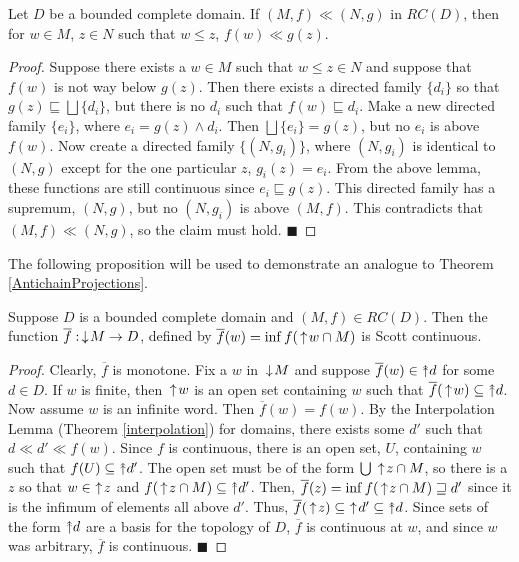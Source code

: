 \begin{proposition}\label{waybelow}
Let $D$ be a bounded complete domain.  If $(M,f) \ll (N,g)$ in $RC(D)$, then for $w\in M$, $z\in N$ such that $w\leq z$, $f(w) \ll g(z)$.
\end{proposition}
\begin{proof}
Suppose there exists a $w\in M$ such that $w\leq z\in N$ and suppose that $f(w)$ is not way below $g(z)$.  Then there exists a directed family $\{d_i\}$ so that $g(z)\sqsubseteq \bigsqcup \{d_i\}$, but there is no $d_i$ such that $f(w) \sqsubseteq d_i$.  Make a new directed family $\{e_i\}$, where $e_i = g(z) \wedge d_i$.  Then $\bigsqcup \{e_i\} = g(z)$, but no $e_i$ is above $f(w)$.  Now create a directed family $\{(N,g_i)\}$, where $(N,g_i)$ is identical to $(N,g)$ except for the one particular $z$, $g_i(z) = e_i$.  From the above lemma, these functions are still continuous since $e_i \sqsubseteq g(z)$.  This directed family has a supremum, $(N,g)$, but no $(N,g_i)$ is above $(M,f)$.  This contradicts that $(M,f) \ll (N,g)$, so the claim must hold. \hfill $\blacksquare$
\end{proof}
The following proposition will be used to demonstrate an analogue to Theorem \ref{AntichainProjections}.

\begin{proposition}
Suppose $D$ is a bounded complete domain and $(M,f)\in RC(D)$.  Then the function $\overline{f}:\,\downarrow\! M -> D$, defined by $\overline{f}(w) = \inf f(\,\uparrow\! w \cap M)$ is Scott continuous.
\end{proposition}
\begin{proof}
Clearly, $\overline{f}$ is monotone.  
Fix a $w$ in $\,\downarrow\! M$ and suppose $\overline{f}(w) \in \Ua d$ for some $d\in D$.  If $w$ is finite, then $\,\uparrow\! w$ is an open set containing $w$ such that $\overline{f}(\ua w) \subseteq \Ua d$.  Now assume $w$ is an infinite word.  Then $\overline{f}(w) = f(w)$.  By the Interpolation Lemma (Theorem \ref{interpolation}) for domains, there exists some $d'$ such that $d \ll d' \ll f(w)$.  Since $f$ is continuous, there is an open set, $U$, containing $w$ such that $f(U)\subseteq \Ua d'$.  The open set must be of the form $\bigcup \,\uparrow\! z \cap M$, so there is a $z$ so that $w\in\, \,\uparrow\! z$ and $f(\ua z \cap M) \subseteq \Ua d'$.  Then, $\overline{f}(z) = \inf f(\,\uparrow\! z \cap M) \sqsupseteq d'$ since it is the infimum of elements all above $d'$.  Thus, $\overline{f}(\ua z) \subseteq\, \ua d' \subseteq \Ua d$.  Since sets of the form $\Ua d$ are a basis for the topology of $D$, $\overline{f}$ is continuous at $w$, and since $w$ was arbitrary, $\overline{f}$ is continuous.
\hfill $\blacksquare$
\end{proof}

